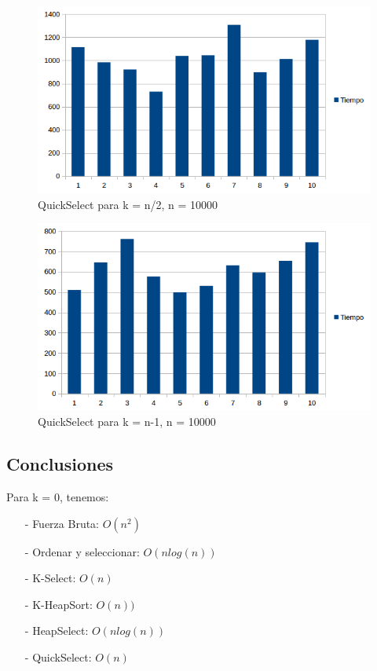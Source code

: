 \begin{figure}[H]
\centering
\includegraphics[width=\textwidth]{KN2/QuickSelectN2.png}
\caption{QuickSelect para k = n/2, n = 10000}
\end{figure}

\begin{figure}[H]
\centering
\includegraphics[width=\textwidth]{KN/QuickSelectN.png}
\caption{QuickSelect para k = n-1, n = 10000}
\end{figure}
\newpage

\subsection{Conclusiones}

Para k = 0, tenemos:
\begin{itemize}
\item[-] Fuerza Bruta: $O(n^2)$
\item[-] Ordenar y seleccionar: $O(n log(n))$
\item[-] K-Select: $O(n)$
\item[-] K-HeapSort: $O(n))$
\item[-] HeapSelect: $O(n log(n))$
\item[-] QuickSelect: $O(n)$
\end{itemize}

